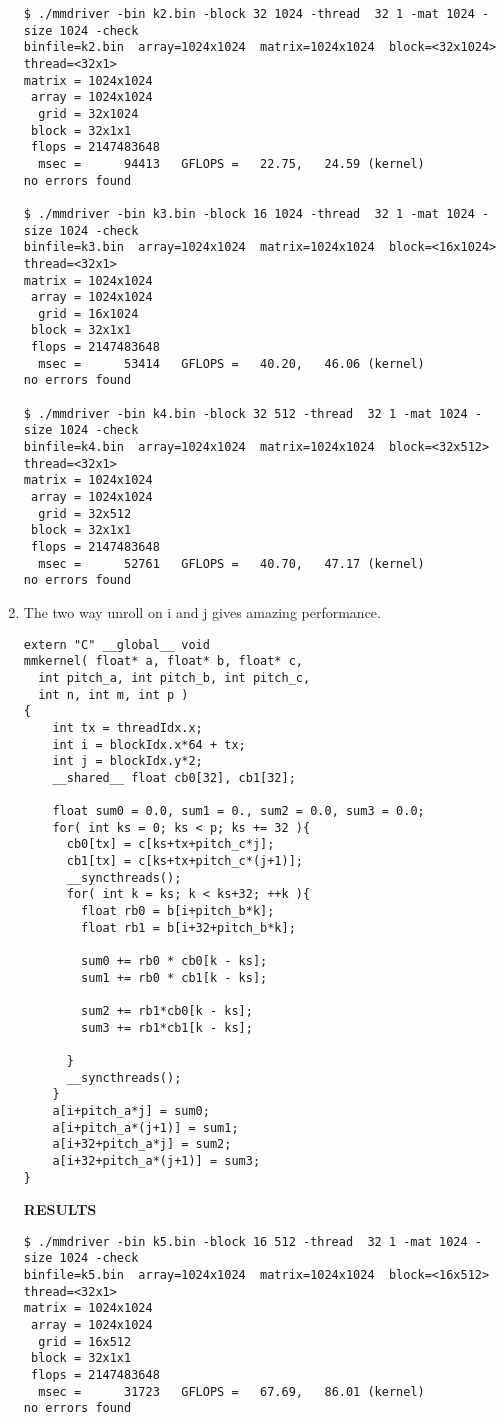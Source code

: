 \documentclass[11pt]{article}
\begin{document}
\begin{enumerate}
\begin{lstlisting}
$ ./mmdriver -bin k2.bin -block 32 1024 -thread  32 1 -mat 1024 -size 1024 -check
binfile=k2.bin  array=1024x1024  matrix=1024x1024  block=<32x1024>  thread=<32x1>
matrix = 1024x1024
 array = 1024x1024
  grid = 32x1024
 block = 32x1x1
 flops = 2147483648
  msec =      94413   GFLOPS =   22.75,   24.59 (kernel)
no errors found

$ ./mmdriver -bin k3.bin -block 16 1024 -thread  32 1 -mat 1024 -size 1024 -check
binfile=k3.bin  array=1024x1024  matrix=1024x1024  block=<16x1024>  thread=<32x1>
matrix = 1024x1024
 array = 1024x1024
  grid = 16x1024
 block = 32x1x1
 flops = 2147483648
  msec =      53414   GFLOPS =   40.20,   46.06 (kernel)
no errors found

$ ./mmdriver -bin k4.bin -block 32 512 -thread  32 1 -mat 1024 -size 1024 -check
binfile=k4.bin  array=1024x1024  matrix=1024x1024  block=<32x512>  thread=<32x1>
matrix = 1024x1024
 array = 1024x1024
  grid = 32x512
 block = 32x1x1
 flops = 2147483648
  msec =      52761   GFLOPS =   40.70,   47.17 (kernel)
no errors found
\end{lstlisting}
\item The two way unroll on i and j gives amazing performance.

\begin{lstlisting}
extern "C" __global__ void
mmkernel( float* a, float* b, float* c,
  int pitch_a, int pitch_b, int pitch_c,
  int n, int m, int p )
{
    int tx = threadIdx.x;
    int i = blockIdx.x*64 + tx;
    int j = blockIdx.y*2;
    __shared__ float cb0[32], cb1[32];

    float sum0 = 0.0, sum1 = 0., sum2 = 0.0, sum3 = 0.0;
    for( int ks = 0; ks < p; ks += 32 ){
      cb0[tx] = c[ks+tx+pitch_c*j];
      cb1[tx] = c[ks+tx+pitch_c*(j+1)];
      __syncthreads();
      for( int k = ks; k < ks+32; ++k ){
        float rb0 = b[i+pitch_b*k];
        float rb1 = b[i+32+pitch_b*k];

        sum0 += rb0 * cb0[k - ks];
        sum1 += rb0 * cb1[k - ks];

        sum2 += rb1*cb0[k - ks];
        sum3 += rb1*cb1[k - ks];

      }
      __syncthreads();
    }
    a[i+pitch_a*j] = sum0;
    a[i+pitch_a*(j+1)] = sum1;
    a[i+32+pitch_a*j] = sum2;
    a[i+32+pitch_a*(j+1)] = sum3;
}
\end{lstlisting}

\textbf{RESULTS}
\begin{lstlisting}
$ ./mmdriver -bin k5.bin -block 16 512 -thread  32 1 -mat 1024 -size 1024 -check
binfile=k5.bin  array=1024x1024  matrix=1024x1024  block=<16x512>  thread=<32x1>
matrix = 1024x1024
 array = 1024x1024
  grid = 16x512
 block = 32x1x1
 flops = 2147483648
  msec =      31723   GFLOPS =   67.69,   86.01 (kernel)
no errors found
\end{lstlisting}


\end{enumerate}
\end{document}
